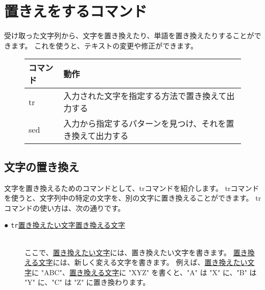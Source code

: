 \begin{tcolorbox}[title=\useOmetoi]
    \begin{enumerate}
    \end{enumerate}
\end{tcolorbox}
\newpage
\section{置きえをするコマンド}
受け取った文字列から、文字を置き換えたり、単語を置き換えたりすることができます。
これを使うと、テキストの変更や修正ができます。

\begin{figure}[h]
    \begin{tabular}{ll}
    コマンド & 動作                                                       \\ \hline
    tr       & 入力された文字を指定する方法で置き換えて出力する           \\
    sed      & 入力から指定するパターンを見つけ、それを置き換えて出力する \\ \hline
    \end{tabular}
\end{figure}

\subsection{文字の置き換え}
文字を置き換えるためのコマンドとして、trコマンドを紹介します。
trコマンドを使うと、文字列中の特定の文字を、別の文字に置き換えることができます。
trコマンドの使い方は、次の通りです。


\begin{description}
    \item[● \texttt{tr}\textvisiblespace \underline{置き換えたい文字}\textvisiblespace \underline{置き換える文字}]\mbox{}\\
    ここで、\underline{置き換えたい文字}には、置き換えたい文字を書きます。
    \underline{置き換える文字}には、新しく変える文字を書きます。
    例えば、\underline{置き換えたい文字}に "ABC"、\underline{置き換える文字}に "XYZ" を書くと、"A" は "X" に、"B" は "Y" に、"C" は "Z"
    に置き換わります。
\end{description}


